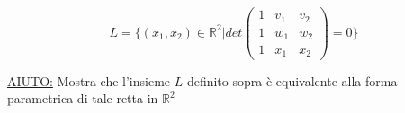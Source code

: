 \documentclass[a4paper,10pt]{article}
\begin{document}

    $$L= \{ (x_{1}, x_{2}) \in \mathbb{R}^{2} \vert det{
        \begin{pmatrix}
            1 & v_{1} & v_{2} \\
            1 & w_{1} & w_{2} \\
            1 & x_{1} & x_{2}
        \end{pmatrix}
    } = 0 \}$$


    \underline{AIUTO:} 
    Mostra che l'insieme $L$ definito sopra è equivalente alla forma parametrica
    di tale retta in $\mathbb{R}^{2}$

\end{document}
